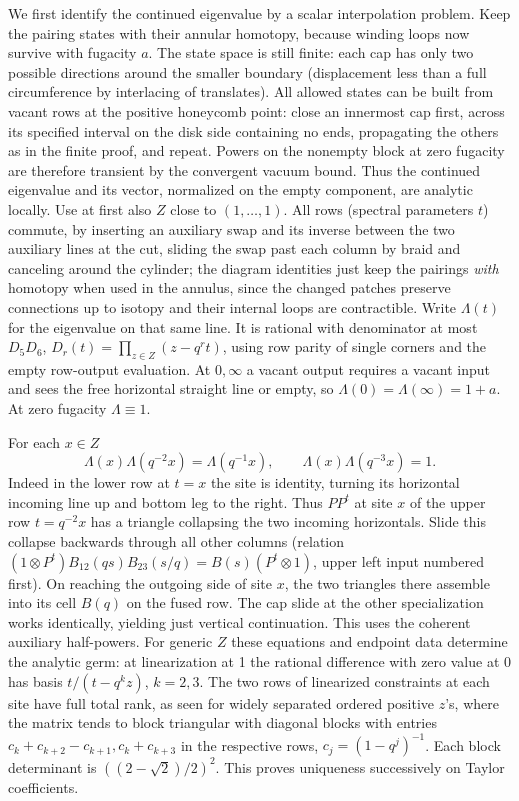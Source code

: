 We first identify the continued eigenvalue by a scalar interpolation problem. Keep the pairing states with their annular homotopy, because winding loops now survive with fugacity $a$. The state space is still finite: each cap has only two possible directions around the smaller boundary (displacement less than a full circumference by interlacing of translates). All allowed states can be built from vacant rows at the positive honeycomb point: close an innermost cap first, across its specified interval on the disk side containing no ends, propagating the others as in the finite proof, and repeat. Powers on the nonempty block at zero fugacity are therefore transient by the convergent vacuum bound. Thus the continued eigenvalue and its vector, normalized on the empty component, are analytic locally. Use at first also \(Z\) close to \((1,\ldots,1)\). All rows (spectral parameters \(t\)) commute, by inserting an auxiliary swap and its inverse between the two auxiliary lines at the cut, sliding the swap past each column by braid and canceling around the cylinder; the diagram identities just keep the pairings \emph{with} homotopy when used in the annulus, since the changed patches preserve connections up to isotopy and their internal loops are contractible. Write \(\Lambda(t)\) for the eigenvalue on that same line. It is rational with denominator at most \(D_5 D_6\), \(D_r(t)=\prod_{z\in Z}(z-q^r t)\), using row parity of single corners and the empty row-output evaluation. At \(0,\infty\) a vacant output requires a vacant input and sees the free horizontal straight line or empty, so \(\Lambda(0)=\Lambda(\infty)=1+a\). At zero fugacity \(\Lambda\equiv1\).

For each \(x\in Z\)
\[
 \Lambda(x)\Lambda(q^{-2}x)=\Lambda(q^{-1}x),\qquad
 \Lambda(x)\Lambda(q^{-3}x)=1 .
\]
Indeed in the lower row at \(t=x\) the site is identity, turning its horizontal incoming line up and bottom leg to the right. Thus \(PP^t\) at site \(x\) of the upper row \(t=q^{-2}x\) has a triangle collapsing the two incoming horizontals. Slide this collapse backwards through all other columns (relation \((1\otimes P^t)B_{12}(qs)B_{23}(s/q)=B(s)(P^t\otimes1)\), upper left input numbered first). On reaching the outgoing side of site \(x\), the two triangles there assemble into its cell \(B(q)\) on the fused row. The cap slide at the other specialization works identically, yielding just vertical continuation. This uses the coherent auxiliary half-powers. For generic \(Z\) these equations and endpoint data determine the analytic germ: at linearization at 1 the rational difference with zero value at 0 has basis \(t/(t-q^k z)\), \(k=2,3\). The two rows of linearized constraints at each site have full total rank, as seen for widely separated ordered positive \(z\)'s, where the matrix tends to block triangular with diagonal blocks with entries \(c_k+c_{k+2}-c_{k+1},c_k+c_{k+3}\) in the respective rows, \(c_j=(1-q^j)^{-1}\). Each block determinant is \(((2-\sqrt2)/2)^2\). This proves uniqueness successively on Taylor coefficients.

